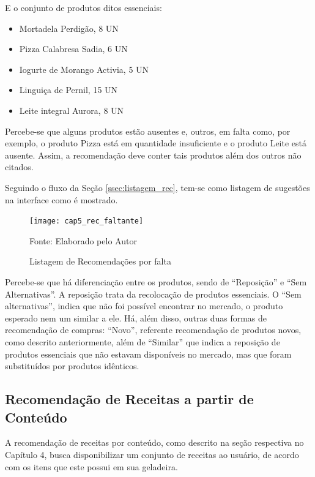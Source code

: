 E o conjunto de produtos ditos essenciais:

\begin{itemize} \parskip -3pt
    \item Mortadela Perdigão, 8 UN
    \item Pizza Calabresa Sadia, 6 UN
    \item Iogurte de Morango Activia, 5 UN
    \item Linguiça de Pernil, 15 UN
    \item Leite integral Aurora, 8 UN
\end{itemize}


Percebe-se que alguns produtos estão ausentes e, outros, em falta como, por exemplo, o produto Pizza está em quantidade insuficiente e o produto Leite está ausente. Assim, a recomendação deve conter tais produtos além dos outros não citados.

Seguindo o fluxo da Seção \ref{ssec:listagem_rec}, tem-se como listagem de sugestões na interface como é mostrado.

\begin{figure}[htb]
    \caption{Listagem de Recomendações por falta}
    \label{fig:cap5_rec_faltante}
    \texttt{[image: cap5\_rec\_faltante]}
    
    \footnotesize{Fonte: Elaborado pelo Autor}
\end{figure}


Percebe-se que há diferenciação entre os produtos, sendo de ``Reposição'' e ``Sem Alternativas''. A reposição trata da recolocação de produtos essenciais. O ``Sem alternativas'', indica que não foi possível encontrar no mercado, o produto esperado nem um similar a ele. Há, além disso, outras duas formas de recomendação de compras: ``Novo'', referente recomendação de produtos novos, como descrito anteriormente, além de ``Similar'' que indica a reposição de produtos essenciais que não estavam disponíveis no mercado, mas que foram substituídos por produtos idênticos.

\subsection{Recomendação de Receitas a partir de Conteúdo}

A recomendação de receitas por conteúdo, como descrito na seção respectiva no Capítulo 4, busca disponibilizar um conjunto de receitas ao usuário, de acordo com os itens que este possui em sua geladeira. 


